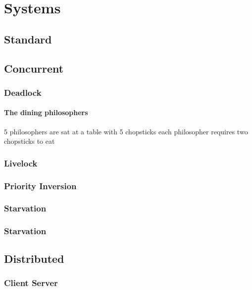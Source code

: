 \documentclass[a4paper,oneside]{article}
\begin{document}
\tableofcontents

\section{Systems}


	\subsection{Standard}



	\subsection{Concurrent}

		\subsubsection{Deadlock}
			\paragraph{The dining philosophers}
			5 philosophers are sat at a table with 5 chopsticks each philosopher requires two chopsticks to eat


		\subsubsection{Livelock}

		\subsubsection{Priority Inversion}

		\subsubsection{Starvation}

		\subsubsection{Starvation}


	\subsection{Distributed}

		\subsubsection{Client Server}
\end{document}
